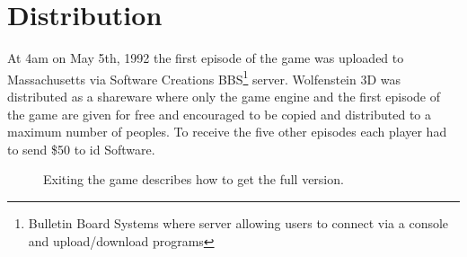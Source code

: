 \documentclass[book.tex]{subfiles}
\begin{document}
\section{Distribution}
At 4am on May 5th, 1992 the first episode of the game was uploaded to Massachusetts via Software Creations BBS\footnote{Bulletin Board Systems where server allowing users to connect via a console and upload/download programs} server. Wolfenstein 3D was distributed as a shareware where only the game engine and the first episode of the game are given for free and encouraged to be copied and distributed to a maximum number of peoples. To receive the five other episodes each player had to send \$50 to id Software.\\
\par
\begin{figure}[H]
\centering
 \caption{Exiting the game describes how to get the full version.}
 \end{figure}
\end{document}
